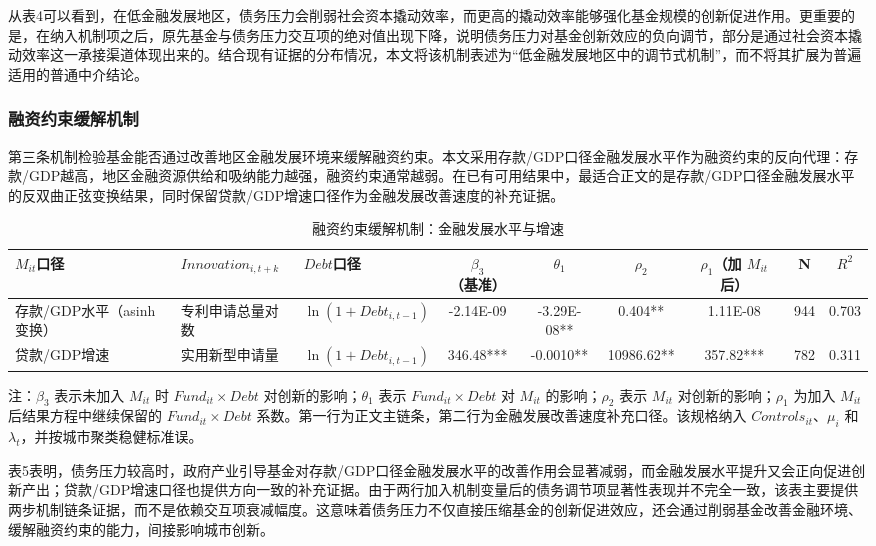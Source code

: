 从表4可以看到，在低金融发展地区，债务压力会削弱社会资本撬动效率，而更高的撬动效率能够强化基金规模的创新促进作用。更重要的是，在纳入机制项之后，原先基金与债务压力交互项的绝对值出现下降，说明债务压力对基金创新效应的负向调节，部分是通过社会资本撬动效率这一承接渠道体现出来的。结合现有证据的分布情况，本文将该机制表述为“低金融发展地区中的调节式机制”，而不将其扩展为普遍适用的普通中介结论。

\subsubsection{融资约束缓解机制}

第三条机制检验基金能否通过改善地区金融发展环境来缓解融资约束。本文采用存款/GDP口径金融发展水平作为融资约束的反向代理：存款/GDP越高，地区金融资源供给和吸纳能力越强，融资约束通常越弱。在已有可用结果中，最适合正文的是存款/GDP口径金融发展水平的反双曲正弦变换结果，同时保留贷款/GDP增速口径作为金融发展改善速度的补充证据。

\begin{table}[htbp]
  \centering
  \caption{融资约束缓解机制：金融发展水平与增速}
  {\fangsong{}
  \begin{tabular}{l l l c c c c c c}
    \toprule
    $M_{it}$口径 & $Innovation_{i,t+k}$ & $Debt$口径 & $\beta_3$（基准） & $\theta_1$ & $\rho_2$ & $\rho_1$（加 $M_{it}$ 后） & N & $R^2$ \\
    \midrule
    存款/GDP水平（asinh变换） & 专利申请总量对数 & $\ln(1+Debt_{i,t-1})$ & -2.14E-09 & -3.29E-08** & 0.404** & 1.11E-08 & 944 & 0.703 \\
    贷款/GDP增速 & 实用新型申请量 & $\ln(1+Debt_{i,t-1})$ & 346.48*** & -0.0010** & 10986.62** & 357.82*** & 782 & 0.311 \\
    \bottomrule
  \end{tabular}%

  \par\smallskip
  {\songti{}注：$\beta_3$ 表示未加入 $M_{it}$ 时 $Fund_{it}\times Debt$ 对创新的影响；$\theta_1$ 表示 $Fund_{it}\times Debt$ 对 $M_{it}$ 的影响；$\rho_2$ 表示 $M_{it}$ 对创新的影响；$\rho_1$ 为加入 $M_{it}$ 后结果方程中继续保留的 $Fund_{it}\times Debt$ 系数。第一行为正文主链条，第二行为金融发展改善速度补充口径。该规格纳入 $Controls_{it}$、$\mu_i$ 和 $\lambda_t$，并按城市聚类稳健标准误。}
  }
\end{table}

表5表明，债务压力较高时，政府产业引导基金对存款/GDP口径金融发展水平的改善作用会显著减弱，而金融发展水平提升又会正向促进创新产出；贷款/GDP增速口径也提供方向一致的补充证据。由于两行加入机制变量后的债务调节项显著性表现并不完全一致，该表主要提供两步机制链条证据，而不是依赖交互项衰减幅度。这意味着债务压力不仅直接压缩基金的创新促进效应，还会通过削弱基金改善金融环境、缓解融资约束的能力，间接影响城市创新。

